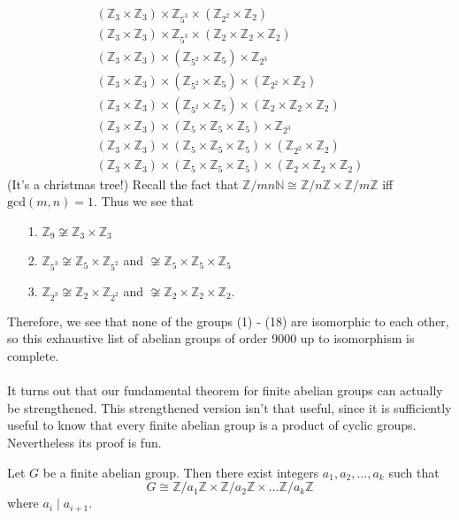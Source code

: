 \documentclass[12pt,letterpaper]{algebra_book}
\newcommand{\ZZ}{\mathbb{Z}}
\theoremstyle{definition}
\begin{document}
    \begin{gather}
        (\ZZ_3 \times \ZZ_3) \times \ZZ_{5^3} \times (\ZZ_{2^2} \times \ZZ_2)\\
        (\ZZ_3 \times \ZZ_3) \times \ZZ_{5^3} \times (\ZZ_{2} \times \ZZ_2 \times \ZZ_2)\\
        (\ZZ_3 \times \ZZ_3) \times (\ZZ_{5^2} \times \ZZ_5) \times \ZZ_{2^3} \\
        (\ZZ_3 \times \ZZ_3) \times (\ZZ_{5^2} \times \ZZ_5) \times (\ZZ_{2^2} \times \ZZ_2)\\
        (\ZZ_3 \times \ZZ_3) \times (\ZZ_{5^2} \times \ZZ_5) \times (\ZZ_{2} \times \ZZ_2 \times \ZZ_2)\\
        (\ZZ_3 \times \ZZ_3) \times (\ZZ_{5} \times \ZZ_5 \times \ZZ_5) \times \ZZ_{2^3} \\
        (\ZZ_3 \times \ZZ_3) \times (\ZZ_{5} \times \ZZ_5 \times \ZZ_5) \times (\ZZ_{2^2} \times \ZZ_2)\\
       (\ZZ_3 \times \ZZ_3) \times (\ZZ_{5} \times \ZZ_5 \times \ZZ_5) \times (\ZZ_{2} \times \ZZ_2 \times \ZZ_2)
    \end{gather}
    (It's a christmas tree!) Recall the fact that
    $\mathbb{Z}/mn\mathbb{N} \cong \mathbb{Z}/n\mathbb{Z} \times
    \mathbb{Z}/m\mathbb{Z}$
    iff $\mbox{gcd}(m, n) = 1$. Thus we see that 
    \begin{itemize}
        \item[1.] $\ZZ_9 \not\cong \ZZ_3 \times \ZZ_3$

        \item[2.] $\ZZ_{5^3} \not\cong \ZZ_5 \times \ZZ_{5^2}$ and
        $\not\cong \ZZ_5 \times \ZZ_5 \times \ZZ_5$

        \item[3.] $\ZZ_{2^3} \not\cong \ZZ_2 \times \ZZ_{2^2}$ and
        $\not\cong \ZZ_2 \times \ZZ_2 \times \ZZ_2$.
    \end{itemize}
    Therefore, we see that none of the groups (1) - (18) are
    isomorphic to each other, so this exhaustive list of abelian
    groups of order 9000 up to isomorphism is complete.
    \\
    \\
    It turns out that our fundamental theorem for finite abelian
    groups can actually be strengthened. This strengthened version
    isn't that useful, since it is sufficiently useful to know that
    every finite abelian group is a product of cyclic groups.
    Nevertheless its proof is fun. 

    \begin{thm}
        Let $G$ be a finite abelian group. Then there exist integers
        $a_1, a_2, \dots, a_k$ such that 
        \[
            G \cong \ZZ/a_1\ZZ \times \ZZ/a_2\ZZ \times \dots \ZZ/a_k\ZZ
        \]
        where $a_i \mid a_{i+1}$.
    \end{thm}
\end{document}
